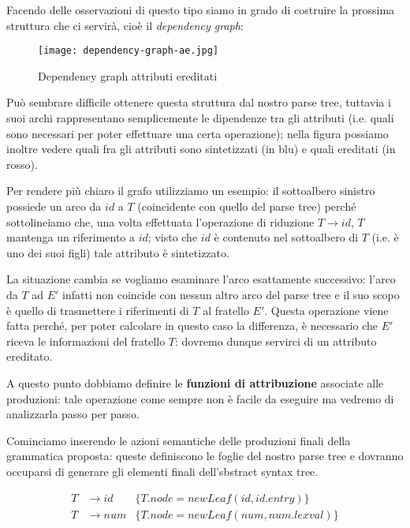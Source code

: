 \documentclass[class=book, crop=false, oneside, 12pt]{standalone}
\begin{document}
Facendo delle osservazioni di questo tipo siamo in grado di costruire la prossima struttura che ci servirà, cioè il \emph{dependency graph}: 

\begin{figure}[H]
	\centering
    \texttt{[image: dependency-graph-ae.jpg]}
    \caption{Dependency graph attributi ereditati}
    \label{fig:dependency-graph-ae}
\end{figure}

Può sembrare difficile ottenere questa struttura dal nostro parse tree, tuttavia i suoi archi rappresentano semplicemente le dipendenze tra gli attributi (i.e. quali sono necessari per poter effettuare una certa operazione); nella figura possiamo inoltre vedere quali fra gli attributi sono sintetizzati (in blu) e quali ereditati (in rosso). 

Per rendere più chiaro il grafo utilizziamo un esempio: il sottoalbero sinistro possiede un arco da \(id\) a \(T\) (coincidente con quello del parse tree) perché sottolineiamo che, una volta effettuata l'operazione di riduzione \(T \to id\), \(T\) mantenga un riferimento a \(id\); visto che \(id\) è contenuto nel sottoalbero di \(T\) (i.e. è uno dei suoi figli) tale attributo è sintetizzato. 

La situazione cambia se vogliamo esaminare l'arco esattamente successivo: l'arco da \(T\) ad \(E'\) infatti non coincide con nessun altro arco del parse tree e il suo scopo è quello di trasmettere i riferimenti di \(T\) al fratello \(E'\). Questa operazione viene fatta perché, per poter calcolare in questo caso la differenza, è necessario che \(E'\) riceva le informazioni del fratello \(T\): dovremo dunque servirci di un attributo ereditato.

A questo punto dobbiamo definire le \textbf{funzioni di attribuzione} associate alle produzioni: tale operazione come sempre non è facile da eseguire ma vedremo di analizzarla passo per passo. 

Cominciamo inserendo le azioni semantiche delle produzioni finali della grammatica proposta: queste definiscono le foglie del nostro parse tree e dovranno occuparsi di generare gli elementi finali dell'sbstract syntax tree.

\begin{align*}
    T &\to id &\{T.node = newLeaf(id, id.entry)\} \\
    T &\to num &\{T.node = newLeaf(num, num.lexval)\}
\end{align*}
\end{document}
